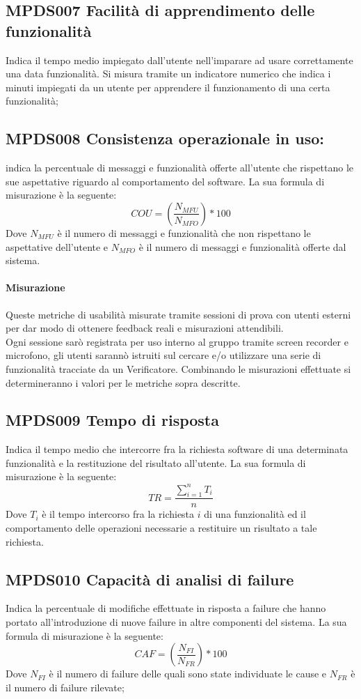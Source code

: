 \documentclass[NormeDiProgetto.tex]{subfiles}
\begin{document}
\subsection{MPDS007 Facilità di apprendimento delle funzionalità} Indica il tempo medio impiegato dall'utente nell'imparare ad usare correttamente una data funzionalità. Si misura tramite un indicatore numerico che indica i minuti impiegati da un utente per apprendere il funzionamento di una certa funzionalità;
\subsection{MPDS008 Consistenza operazionale in uso:} indica la percentuale di messaggi e funzionalità offerte all'utente che rispettano le sue aspettative riguardo al comportamento del software. La sua formula di misurazione è la seguente: \[COU=(\frac{N_{MFU}}{N_{MFO}})*100\] Dove $ N_{MFU} $ è il numero di messaggi e funzionalità che non rispettano le aspettative dell'utente e $ N_{MFO} $ è il numero di messaggi e funzionalità offerte dal sistema.	

\paragraph{Misurazione}
Queste metriche di usabilità misurate tramite sessioni di prova con utenti esterni per dar modo di ottenere feedback reali e misurazioni attendibili.\\ Ogni sessione sarò registrata per uso interno al gruppo tramite screen recorder e microfono, gli utenti sarannò istruiti sul cercare e/o utilizzare una serie di funzionalità tracciate da un Verificatore.
Combinando le misurazioni effettuate si determineranno i valori per le metriche sopra descritte.


\subsection{MPDS009 Tempo di risposta} Indica il tempo medio che intercorre fra la richiesta software di una determinata funzionalità e la restituzione del risultato all'utente. La sua formula di misurazione è la seguente: \[TR=\frac{\sum_{i=1}^n T_i}{n}\] Dove $ T_i $ è il tempo intercorso fra la richiesta $ i $ di una funzionalità ed il comportamento delle operazioni necessarie a restituire un risultato a tale richiesta.	

\subsection{MPDS010 Capacità di analisi di failure} Indica la percentuale di modifiche effettuate in risposta a failure che hanno portato all'introduzione di nuove failure in altre componenti del sistema. La sua formula di misurazione è la seguente: \[CAF=(\frac{N_{FI}}{N_{FR}})*100\] Dove $ N_{FI} $ è il numero di failure delle quali sono state individuate le cause e $ N_{FR} $ è il numero di failure rilevate;
\end{document}
